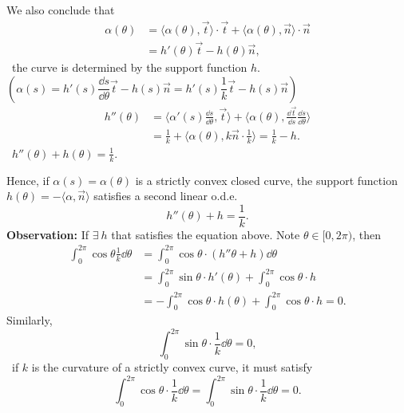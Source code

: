 We also conclude that
\begin{align*}
    \alpha(\theta)&=\langle \alpha(\theta), \vec{t}\rangle \cdot \vec{t}
    +\langle \alpha(\theta), \vec{n}\rangle \cdot \vec{n}\\
    &=h'(\theta)\vec{t}-h(\theta)\vec{n}
,\end{align*}
\ie\ the curve is determined by the support function $h$. \\
$\left(\alpha(s)=h'(s)\dfrac{\dd s}{\dd \theta}\vec{t}-h(s)\vec{n}=h'(s)\dfrac{1}{k}\vec{t}-h(s)\vec{n}\right)$
\begin{align*}
    h''(\theta)&=\langle \alpha'(s)\frac{\dd s}{\dd \theta},\vec{t}\rangle
    +\langle \alpha(\theta),\frac{\dd \vec{t}}{\dd s}\frac{\dd s}{\dd \theta}
    \rangle\\
    &=\frac{1}{k}+\langle\alpha(\theta),k\vec{n}\cdot \frac{1}{k}\rangle=\frac{1}{k}-h
.\end{align*}
\ie\ $\boxed{h''(\theta)+h(\theta)=\frac{1}{k}}$.

Hence, if $\alpha(s)=\alpha(\theta)$ is a strictly convex closed curve, the
support function $h(\theta)=-\langle\alpha,\vec{n}\rangle$ satisfies a second
linear o.d.e.
\[h''(\theta)+h=\frac{1}{k}.\]
\textbf{Observation:} If $\exists~h$ that satisfies the equation above.
Note $\theta\in [0,2\pi)$, then
\begin{align*}
    \int_0^{2\pi}\cos\theta\frac{1}{k}\dd \theta&=
    \int_0^{2\pi} \cos\theta\cdot\left(h''\theta+h\right)\dd \theta\\
    &=\int_0^{2\pi}\sin\theta\cdot h'(\theta)+\int_0^{2\pi}\cos \theta \cdot h\\
    &=-\int_0^{2\pi}\cos\theta \cdot h(\theta)+\int_0^{2\pi}\cos\theta \cdot h=0
.\end{align*}
Similarly,
\[\int_0^{2\pi}\sin\theta\cdot\frac{1}{k}\dd \theta=0,\]
\ie\ if $k$ is the curvature of a strictly convex curve, it must satisfy
\[
    \int_0^{2\pi}\cos\theta\cdot\frac{1}{k}\dd \theta
    =\int_0^{2\pi}\sin\theta\cdot\frac{1}{k}\dd \theta
    =0
.\]

